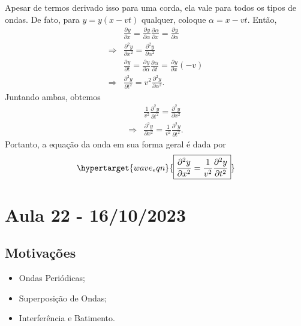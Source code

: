 \documentclass{article}
\begin{document}
Apesar de termos derivado isso para uma corda, ela vale para todos os tipos de ondas. De fato, para
\(y = y(x-vt)\) qualquer, coloque \(\alpha  = x - vt\). Então, 
\begin{align*}
  &\frac{\partial^{}y}{\partial x^{}} = \frac{\partial^{}y}{\partial \alpha ^{}}\frac{\partial^{}\alpha }{\partial x^{}} = \frac{\partial^{}y}{\partial \alpha ^{}}\\
  \Rightarrow & \frac{\partial^{2}y}{\partial x^{2}} = \frac{\partial^{2}y}{\partial \alpha ^{2}}\\
              & \frac{\partial^{}y}{\partial t^{}}=\frac{\partial^{}y}{\partial \alpha ^{}}\frac{\partial^{}\alpha }{\partial t^{}}=\frac{\partial^{}y}{\partial x^{}}(-v)\\
  \Rightarrow & \frac{\partial^{2}y}{\partial t^{2}}=v^{2}\frac{\partial^{2}y}{\partial \alpha ^{2}}.
\end{align*}
Juntando ambas, obtemos 
\begin{align*}
   &\frac{1}{v^{2}}\frac{\partial^{2}y}{\partial t^{2}}=\frac{\partial^{2}y}{\partial x^{2}}\\
  \Rightarrow & \frac{\partial^{2}y}{\partial x^{2}}=\frac{1}{v^{2}}\frac{\partial^{2}y}{\partial t^{2}}.
\end{align*}
Portanto, a equação da onda em sua forma geral é dada por 
\[
  \hypertarget{wave_eqn}{\boxed{\frac{\partial^{2}y}{\partial x^{2}}=\frac{1}{v^{2}}\frac{\partial^{2}y}{\partial t^{2}}}}
\]
\newpage

\section{Aula 22 - 16/10/2023}
\subsection{Motivações}
\begin{itemize}
  \item Ondas Periódicas;
  \item Superposição de Ondas;
  \item Interferência e Batimento.
\end{itemize}
\end{document}
